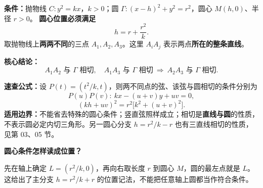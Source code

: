 \begin{statementbox}
\textbf{条件：}抛物线 $C:y^2=kx$，$k>0$；圆
$\Gamma:(x-h)^2+y^2=r^2$，圆心 $M(h,0)$、半径 $r>0$。
\textbf{圆心位置必须满足}
\[
\boxed{h=r+\frac{r^2}{k}}.
\]
取抛物线上\textbf{两两不同}的三点 $A_1,A_2,A_3$。这里 $A_iA_j$ 表示两点\textbf{所在的整条直线}。

\begin{center}

\end{center}

\textbf{核心结论：}
\[
\boxed{A_1A_2\text{ 与 }\Gamma\text{ 相切},\quad
A_1A_3\text{ 与 }\Gamma\text{ 相切}
\ \Longrightarrow\ A_2A_3\text{ 与 }\Gamma\text{ 相切}.}
\]

\textbf{速查公式：}设 $P(t)=(t^2/k,t)$，则两不同点的弦、该弦与圆相切的条件分别为
\[
\boxed{P(u)P(v):\ kx-(u+v)y+uv=0},
\]
\[
\boxed{(kh+uv)^2=r^2\bigl[k^2+(u+v)^2\bigr]}.
\]
\textbf{适用边界：}不能省去特殊的圆心条件；竖直弦照样成立；相切是\textbf{直线与圆}的性质，不表示圆必定内切三角形。另一圆心分支 $h=r^2/k-r$ 也有三直线相切的性质，见第 03、05 节。
\end{statementbox}

\clearpage
\begin{statementbox}
\textbf{圆心条件怎样读成位置？}
\begin{center}

\end{center}
先在轴上确定 $L=(r^2/k,0)$，再向右取长度 $r$ 到圆心 $M$，圆的最左点就是 $L$。这给出了主分支 $h=r^2/k+r$ 的位置记法，不能把任意轴上圆都当作符合条件。
\end{statementbox}

